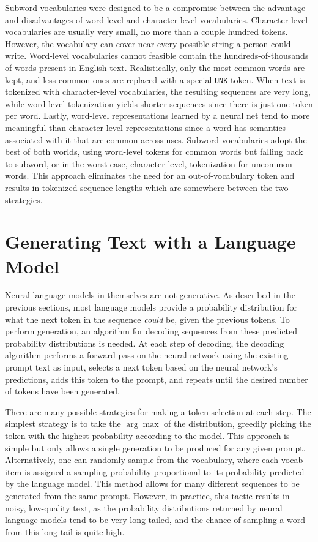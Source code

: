 Subword vocabularies were designed to be a compromise between the advantage and disadvantages of word-level and character-level vocabularies.
Character-level vocabularies are usually very small, no more than a couple hundred tokens.
However, the vocabulary can cover near every possible string a person could write.
Word-level vocabularies cannot feasible contain the hundreds-of-thousands of words present in English text.
Realistically, only the most common words are kept, and less common ones are replaced with a special \texttt{UNK} token.
When text is tokenized with character-level vocabularies, the resulting sequences are very long, while word-level tokenization yields shorter sequences since there is just one token per word.
Lastly, word-level representations learned by a neural net tend to more meaningful than character-level representations since a word has semantics associated with it that are common across uses.
Subword vocabularies adopt the best of both worlds, using word-level tokens for common words but falling back to subword, or in the worst case, character-level, tokenization for uncommon words.
This approach eliminates the need for an out-of-vocabulary token and results in tokenized sequence lengths which are somewhere between the two strategies.


\section{Generating Text with a Language Model}

Neural language models in themselves are not generative.
As described in the previous sections, most language models provide a probability distribution for what the next token in the sequence \textit{could} be, given the previous tokens.
To perform generation, an algorithm for decoding sequences from these predicted probability distributions is needed.
At each step of decoding, the decoding algorithm performs a forward pass on the neural network using the existing prompt text as input, selects a next token based on the neural network's predictions, adds this token to the prompt, and repeats until the desired number of tokens have been generated.

There are many possible strategies for making a token selection at each step.
The simplest strategy is to take the $\arg \max$ of the distribution, greedily picking the token with the highest probability according to the model.
This approach is simple but only allows a single generation to be produced for any given prompt.
Alternatively, one can randomly sample from the vocabulary, where each vocab item is assigned a sampling probability proportional to its probability predicted by the language model.
This method allows for many different sequences to be generated from the same prompt.
However, in practice, this tactic results in noisy, low-quality text, as the probability distributions returned by neural language models tend to be very long tailed, and the chance of sampling a word from this long tail is quite high.

